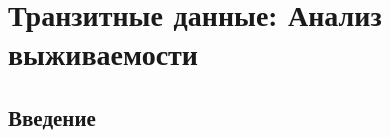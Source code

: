 

\chapter{Транзитные данные: Анализ выживаемости}\label{ch:17}


\section{Введение}
\label{sec:17.1}

